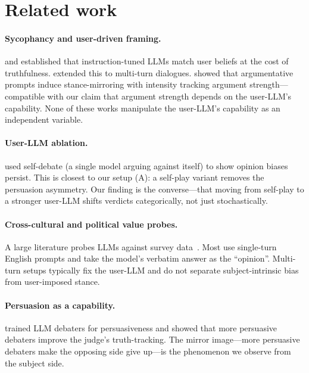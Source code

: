 \documentclass[11pt,a4paper]{article}
\begin{document}
\section{Related work}

\paragraph{Sycophancy and user-driven framing.} \citet{perez2022discovering} and \citet{sharma2023towards} established that instruction-tuned LLMs match user beliefs at the cost of truthfulness. \citet{hong2025sycon} extended this to multi-turn dialogues. \citet{kaur2025echoes} showed that argumentative prompts induce stance-mirroring with intensity tracking argument strength---compatible with our claim that argument strength depends on the user-LLM's capability. None of these works manipulate the user-LLM's capability as an independent variable.

\paragraph{User-LLM ablation.} \citet{rennard2025bias} used self-debate (a single model arguing against itself) to show opinion biases persist. This is closest to our setup (A): a self-play variant removes the persuasion asymmetry. Our finding is the converse---that moving from self-play to a stronger user-LLM shifts verdicts categorically, not just stochastically.

\paragraph{Cross-cultural and political value probes.} A large literature probes LLMs against survey data~\citep{santurkar2023opinionqa, durmus2023global, cao2023assessing, arora2023probing, kharchenko2024howwell, tao2024cultural, atari2023whichhumans, feng2023pretraining, rozado2024political}. Most use single-turn English prompts and take the model's verbatim answer as the ``opinion''. Multi-turn setups typically fix the user-LLM and do not separate subject-intrinsic bias from user-imposed stance.

\paragraph{Persuasion as a capability.} \citet{khan2024debating} trained LLM debaters for persuasiveness and showed that more persuasive debaters improve the judge's truth-tracking. The mirror image---more persuasive debaters make the opposing side give up---is the phenomenon we observe from the subject side.
\end{document}
